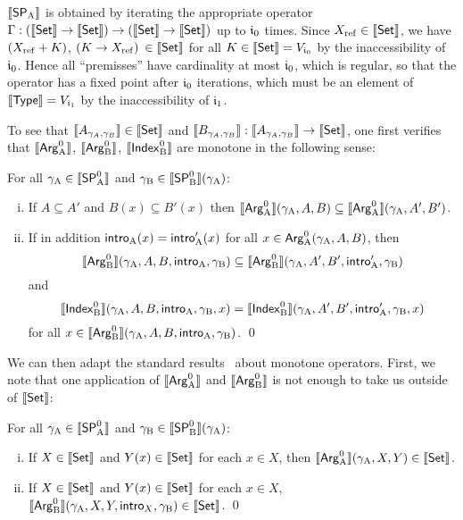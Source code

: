 \documentclass{schwicht}
\begin{document}
$\sem{\SPA}$ is obtained by iterating the appropriate operator $\Gamma
: (\sem{\Set} \to \sem{\Set}) \to (\sem{\Set} \to \sem{\Set})$ up to
$\cardz$ times. Since $\Xref \in \sem{\Set}$, we have $(\Xref + K)$,
$(K \to \Xref)$ $\in \sem{\Set}$ for all $K \in \sem{\Set} =
V_{\cardz}$ by the inaccessibility of $\cardz$. Hence all
``premisses'' have cardinality at most $\cardz$, which is regular, so
that the operator has a fixed point after $\cardz$ iterations, which
must be an element of $\sem{\TYPE} = V_{\cardi}$ by the
inaccessibility of $\cardi$.

To see that $\sem{A_{\gamma_A, \gamma_B}} \in \sem{\Set}$ and
$\sem{B_{\gamma_A, \gamma_B}} : \sem{A_{\gamma_A, \gamma_B}} \to
\sem{\Set}$, one first verifies that $\sem{\ArgAp}$, $\sem{\ArgBp}$,
$\sem{\IndexBp}$ are monotone in the following sense:
\begin{lemma}
  \label{thm:Arg-monotone}
  For all $\gammaA \in \sem{\SPAp}$ and $\gammaB \in \sem{\SPBp}(\gammaA)$:
  \begin{enumerate}[(i)]
  \item If $A \subseteq A'$ and $B(x) \subseteq B'(x)$ then
    $\sem{\ArgAp}(\gammaA, A, B) \subseteq \sem{\ArgAp}(\gammaA, A', B')$.
  \item If in addition $\introA(x) = \introA'(x)$ for all $x \in \ArgAp(\gammaA, A, B)$, then
    \[
    \sem{\ArgBp}(\gammaA, A, B, \introA, \gammaB) \subseteq \sem{\ArgBp}(\gammaA, A', B', \introA', \gammaB)
    \]
    and
    \[    
    \sem{\IndexBp}(\gammaA, A, B, \introA, \gammaB, x) = \sem{\IndexBp}(\gammaA, A', B', \introA', \gammaB, x)
    \]
    for all $x \in \sem{\ArgBp}(\gammaA, A, B, \introA, \gammaB)$. \qed
  \end{enumerate}
\end{lemma}

We can then adapt the standard results~\cite{aczel1977indDef} about
monotone operators. First, we note that one application of
$\sem{\ArgAp}$ and $\sem{\ArgBp}$ is not enough to take us outside of
$\sem{\Set}$:


\begin{lemma}
  For all $\gammaA \in \sem{\SPAp}$ and $\gammaB \in \sem{\SPBp}(\gammaA)$:
  \begin{enumerate}[(i)]
  \item If $X \in \sem{\Set}$ and $Y(x) \in \sem{\Set}$ for each $x \in X$, then $\sem{\ArgAp}(\gammaA, X, Y) \in \sem{\Set}$.
  \item If $X \in \sem{\Set}$ and $Y(x) \in \sem{\Set}$ for each $x \in X$, $\sem{\ArgBp}(\gammaA, X, Y, \intro{X}, \gammaB) \in \sem{\Set}$. \qed
  \end{enumerate}
  \end{lemma}
\end{document}
